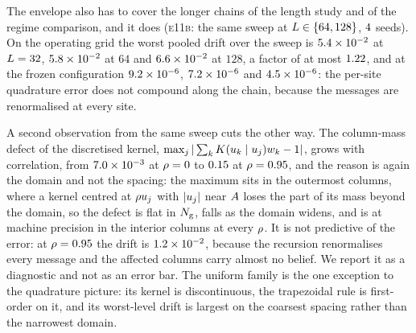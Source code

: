 The envelope also has to cover the longer chains of the length study and of the regime
comparison, and it does (\textsc{e11b}: the same sweep at $L\in\{64, 128\}$,
$4$ seeds). On the operating grid the worst pooled drift over the sweep is
$5.4\times 10^{-2}$ at $L=32$, $5.8\times 10^{-2}$ at $64$ and
$6.6\times 10^{-2}$ at $128$, a factor of at most $1.22$,
and at the frozen configuration $9.2\times 10^{-6}$, $7.2\times 10^{-6}$
and $4.5\times 10^{-6}$: the per-site quadrature error does not compound along
the chain, because the messages are renormalised at every site.

A second observation from the same sweep cuts the other way. The column-mass defect of
the discretised kernel, $\max_j|\sum_k K(u_{k}\mid u_{j})w_k-1|$, grows
with correlation, from $7.0\times 10^{-3}$ at $\rho=0$ to $0.15$
at $\rho=0.95$, and the reason is again the domain and not the spacing: the
maximum sits in the outermost columns, where a kernel centred at $\rho u_{j}$ with
$|u_{j}|$ near $A$ loses the part of its mass beyond the domain, so the
defect is flat in $N_{\mathrm{g}}$, falls as the domain widens, and is at machine precision in the
interior columns at every $\rho$. It is not predictive of the error: at
$\rho=0.95$ the drift is $1.2\times 10^{-2}$, because the recursion
renormalises every message and the affected columns carry almost no belief. We report it
as a diagnostic and not as an error bar. The uniform family is the one exception to the
quadrature picture: its kernel is discontinuous, the trapezoidal rule is first-order on
it, and its worst-level drift is largest on the coarsest spacing rather than the
narrowest domain.
